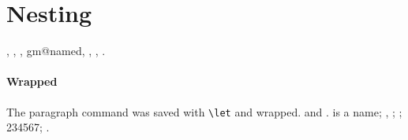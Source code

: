 \section{Nesting}

, \redcheck, \bluecheck, \csname gm@named\endcsname, , \gmopt, \gmopt[set].
\paragraph{Wrapped} The paragraph command was saved with \verb|\let| and wrapped.
 and .%
\gmname is a name; , ;
; 2{3}4{5}6{7}; \gmrobust.\gmfix
{}
